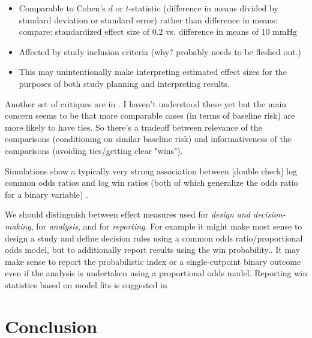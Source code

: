 \documentclass[
  11pt,
  fleqn
]{article}
\begin{document}
\begin{itemize}
  \item Comparable to Cohen's $d$ or $t$-statistic (difference in
    means divided by standard deviation or standard error) rather than
    difference in means: compare: standardized effect size of 0.2 vs.
    difference in means of 10 mmHg
  \item Affected by study inclusion criteria (why? probably needs to
    be fleshed out.)
  \item This may unintentionally make interpreting estimated effect
    sizes for the purposes of both study planning and interpreting results.
\end{itemize}

Another set of critiques are in
\citet{hartmanPitfallsConcordanceIndex2023}. I haven't understood
these yet but the main concern seems to be that more comparable cases
(in terms of baseline risk) are more likely to have ties. So there's
a tradeoff between relevance of the comparisons (conditioning on
similar baseline risk) and informativeness of the comparisons
(avoiding ties/getting clear "wins").

Simulations show a typically very strong association between
[double check] log common odds ratios and log win ratios (both of
which generalize the odds ratio for a binary variable)
\citep{harrellViolationProportionalOdds2020}.

We should distinguish between effect measures used for \emph{design
and decision-making},
for \emph{analysis}, and for
\emph{reporting}. For example it might make most sense to design a
study and define decision rules using a common odds
ratio/proportional odds model, but to
additionally report results using the win probability..
It may make
sense to report the probabilistic index or a
single-cutpoint binary outcome even if the analysis is undertaken using a
proportional odds model. Reporting win statistics based on model fits is
suggested in 
\cite{agrestiOrdinalProbabilityEffect2017,agrestiSimpleWaysInterpret2018}

\section{Conclusion}

\newpage

\printbibliography
\end{document}
